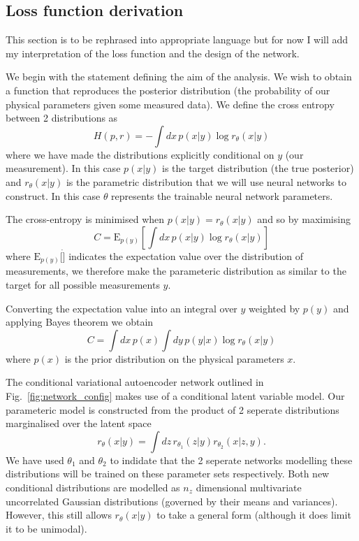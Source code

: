 \documentclass[%
showpacs,
 amsmath,amssymb,
 aps,
 twocolumn,
 prl,
 reprint,
floatfix,
]{revtex4-1}
\begin{document}
\subsection{Loss function derivation}

This section is to be rephrased into appropriate language but for now I will
add my interpretation of the loss function and the design of the network.

We begin with the statement defining the aim of the analysis. We wish to obtain
a function that reproduces the posterior distribution (the probability of our
physical parameters given some measured data). We define the cross entropy
between 2 distributions as
%
\begin{equation}\label{eq:cross_ent}
H(p,r) = -\int dx\, p(x|y) \log r_{\theta}(x|y)
\end{equation}
%
where we have made the distributions explicitly conditional on $y$ (our
measurement). In this case $p(x|y)$ is the target distribution (the true
posterior) and $r_{\theta}(x|y)$ is the parametric distribution that we will
use neural networks to construct. In this case $\theta$ represents the
trainable neural network parameters. 

The cross-entropy is minimised when $p(x|y)=r_{\theta}(x|y)$ and so by maximising
%
\begin{equation}\label{eq:cost1}
C = \text{E}_{p(y)}\left[\int dx\,p(x|y) \log r_{\theta}(x|y)\right]
\end{equation}
% 
where $\text{E}_{p(y)}[\dot]$ indicates the expectation value over the
distribution of measurements, we therefore make the parameteric distribution as
similar to the target for all possible measurements $y$.

Converting the expectation value into an integral over $y$ weighted by $p(y)$
and applying Bayes theorem we obtain
%
\begin{equation}\label{eq:cost1}
C = \int dx\,p(x)\int dy\,p(y|x)\log r_{\theta}(x|y)
\end{equation}
%
where $p(x)$ is the prior distribution on the physical parameters $x$.

The conditional variational autoencoder network outlined in
Fig.~\ref{fig:network_config} makes use of a conditional latent variable model.
Our parameteric model is constructed from the product of 2 seperate
distributions marginalised over the latent space
%
\begin{equation}\label{eq:latent_model}
r_{\theta}(x|y) = \int dz\,r_{\theta_{1}}(z|y)r_{\theta_{2}}(x|z,y).
\end{equation}
%  
We have used $\theta_{1}$ and $\theta_{2}$ to indidate that the 2 seperate
networks modelling these distributions will be trained on these parameter sets
respectively. Both new conditional distributions are modelled as $n_{z}$
dimensional multivariate uncorrelated Gaussian distributions (governed by their
means and variances). However, this still allows $r_{\theta}(x|y)$ to take a
general form (although it does limit it to be unimodal).  
\end{document}
